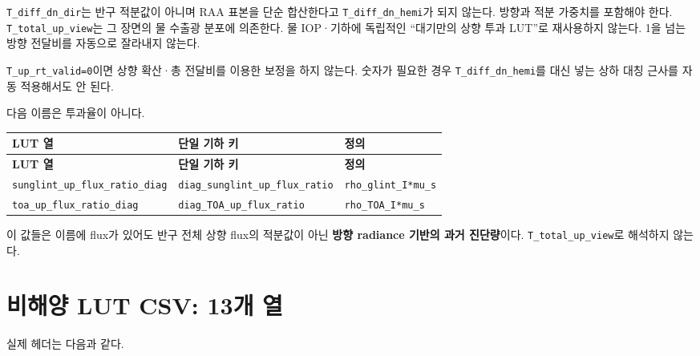 \texttt{T\_\allowbreak{}diff\_\allowbreak{}dn\_\allowbreak{}dir}는 반구 적분값이 아니며 RAA 표본을 단순 합산한다고 \texttt{T\_\allowbreak{}diff\_\allowbreak{}dn\_\allowbreak{}hemi}가 되지 않는다. 방향과 적분 가중치를 포함해야 한다. \texttt{T\_\allowbreak{}total\_\allowbreak{}up\_\allowbreak{}view}는 그 장면의 물 수출광 분포에 의존한다. 물 IOP·기하에 독립적인 “대기만의 상향 투과 LUT”로 재사용하지 않는다. 1을 넘는 방향 전달비를 자동으로 잘라내지 않는다.

\texttt{T\_\allowbreak{}up\_\allowbreak{}rt\_\allowbreak{}valid=\allowbreak{}0}이면 상향 확산·총 전달비를 이용한 보정을 하지 않는다. 숫자가 필요한 경우 \texttt{T\_\allowbreak{}diff\_\allowbreak{}dn\_\allowbreak{}hemi}를 대신 넣는 상하 대칭 근사를 자동 적용해서도 안 된다.

다음 이름은 투과율이 아니다.


{\TableFont
\begin{longtable}{@{}>{\raggedright\arraybackslash}p{}>{\raggedright\arraybackslash}p{}>{\raggedright\arraybackslash}p{}@{}}
\toprule
\textbf{LUT 열} & \textbf{단일 기하 키} & \textbf{정의} \\
\midrule
\endfirsthead
\toprule
\textbf{LUT 열} & \textbf{단일 기하 키} & \textbf{정의} \\
\midrule
\endhead
\bottomrule
\endfoot
\texttt{sunglint\_\allowbreak{}up\_\allowbreak{}flux\_\allowbreak{}ratio\_\allowbreak{}diag} & \texttt{diag\_\allowbreak{}sunglint\_\allowbreak{}up\_\allowbreak{}flux\_\allowbreak{}ratio} & \texttt{rho\_\allowbreak{}glint\_\allowbreak{}I*mu\_\allowbreak{}s} \\
\texttt{toa\_\allowbreak{}up\_\allowbreak{}flux\_\allowbreak{}ratio\_\allowbreak{}diag} & \texttt{diag\_\allowbreak{}TOA\_\allowbreak{}up\_\allowbreak{}flux\_\allowbreak{}ratio} & \texttt{rho\_\allowbreak{}TOA\_\allowbreak{}I*mu\_\allowbreak{}s} \\
\end{longtable}
}

이 값들은 이름에 flux가 있어도 반구 전체 상향 flux의 적분값이 아닌 \textbf{방향 radiance 기반의 과거 진단량}이다. \texttt{T\_\allowbreak{}total\_\allowbreak{}up\_\allowbreak{}view}로 해석하지 않는다.

\section{비해양 LUT CSV: 13개 열}
\label{sec:auto:05_output_formats:6}
실제 헤더는 다음과 같다.


